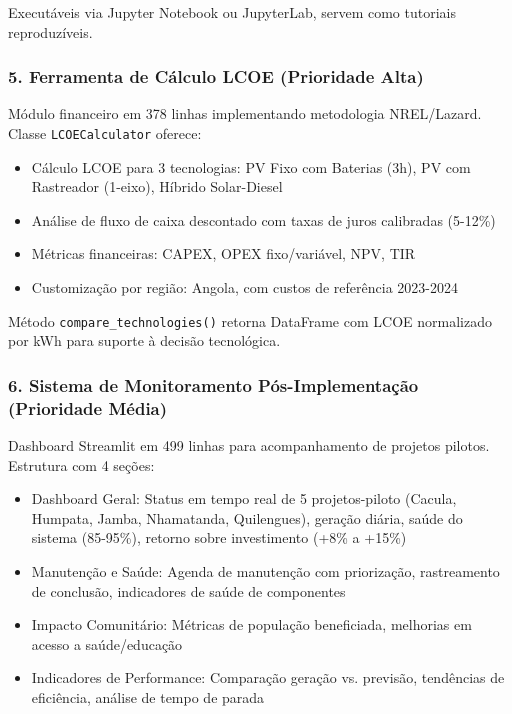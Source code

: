 \documentclass[12pt, a4paper]{article}
\begin{document}
\begin{itemize}
Executáveis via Jupyter Notebook ou JupyterLab, servem como tutoriais reproduzíveis.

\subsubsection{5. Ferramenta de Cálculo LCOE (Prioridade Alta)}

Módulo financeiro em 378 linhas implementando metodologia NREL/Lazard. Classe \texttt{LCOECalculator} oferece:

\begin{itemize}
    \item Cálculo LCOE para 3 tecnologias: PV Fixo com Baterias (3h), PV com Rastreador (1-eixo), Híbrido Solar-Diesel
    \item Análise de fluxo de caixa descontado com taxas de juros calibradas (5-12\%)
    \item Métricas financeiras: CAPEX, OPEX fixo/variável, NPV, TIR
    \item Customização por região: Angola, com custos de referência 2023-2024
\end{itemize}

Método \texttt{compare\_technologies()} retorna DataFrame com LCOE normalizado por kWh para suporte à decisão tecnológica.

\subsubsection{6. Sistema de Monitoramento Pós-Implementação (Prioridade Média)}

Dashboard Streamlit em 499 linhas para acompanhamento de projetos pilotos. Estrutura com 4 seções:

\begin{itemize}
    \item Dashboard Geral: Status em tempo real de 5 projetos-piloto (Cacula, Humpata, Jamba, Nhamatanda, Quilengues), geração diária, saúde do sistema (85-95\%), retorno sobre investimento (+8\% a +15\%)
    \item Manutenção e Saúde: Agenda de manutenção com priorização, rastreamento de conclusão, indicadores de saúde de componentes
    \item Impacto Comunitário: Métricas de população beneficiada, melhorias em acesso a saúde/educação
    \item Indicadores de Performance: Comparação geração vs. previsão, tendências de eficiência, análise de tempo de parada
\end{itemize}


\end{itemize}
\end{document}
